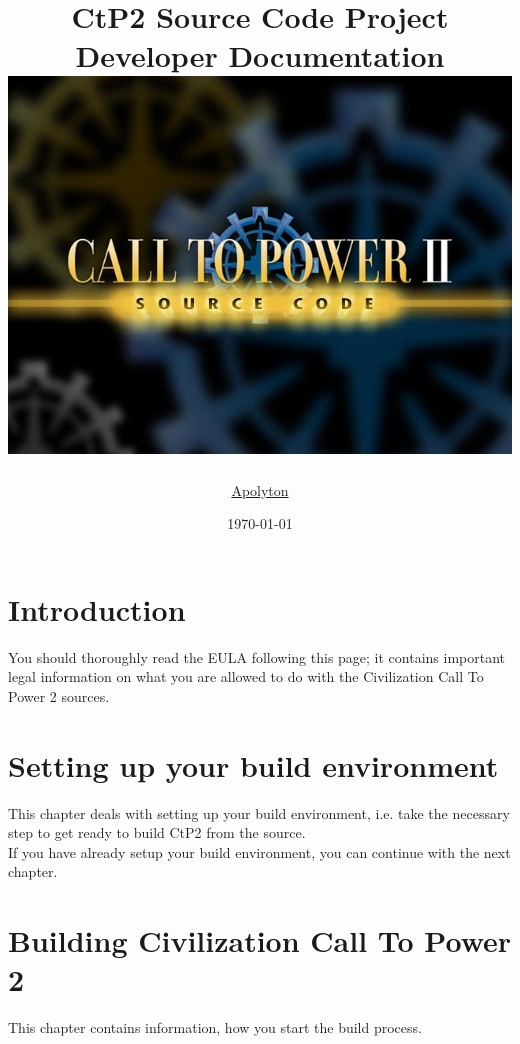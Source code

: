 \documentclass[a4paper,11pt]{book}
\begin{document}
\title{CtP2 Source Code Project\\[5mm]
Developer Documentation\\[20mm]
\includegraphics[scale=0.5]{images/wallpaper1_640x480_2}\\[5mm]}
\author{\href{http://ctp2files.apolyton.net/source/}{Apolyton}}
\date{\today}
\maketitle
\tableofcontents
\newpage
{}
\mainmatter
\chapter{Introduction\label{toc:introduction}}
You should thoroughly read the EULA following this page; it contains important legal information on what you are allowed to do with the Civilization Call To Power 2 sources.\\

\newpage
\chapter{Setting up your build environment\label{toc:setupbenv}}
This chapter deals with setting up your build environment, i.e. take the necessary step to get ready to build CtP2 from the source.\\
If you have already setup your build environment, you can continue with the next chapter.


\chapter{Building Civilization Call To Power 2\label{cha:buildctp2}}
This chapter contains information, how you start the build process.

\end{document}
